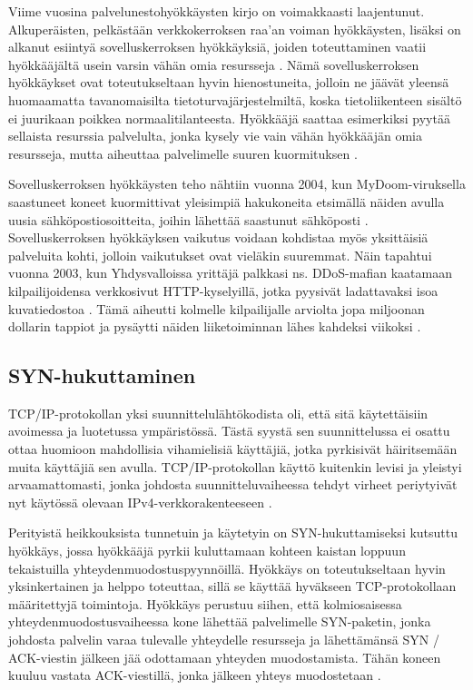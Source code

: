 
Viime vuosina palvelunestohyökkäysten kirjo on voimakkaasti
laajentunut. Alkuperäisten, pelkästään verkkokerroksen raa’an voiman
hyökkäysten, lisäksi on alkanut esiintyä sovelluskerroksen
hyökkäyksiä, joiden toteuttaminen vaatii hyökkääjältä usein varsin
vähän omia resursseja \cite{Hacking}. Nämä sovelluskerroksen
hyökkäykset ovat toteutukseltaan hyvin hienostuneita, jolloin ne
jäävät yleensä huomaamatta tavanomaisilta tietoturvajärjestelmiltä,
koska tietoliikenteen sisältö ei juurikaan poikkea
normaalitilanteesta. Hyökkääjä saattaa esimerkiksi pyytää sellaista
resurssia palvelulta, jonka kysely vie vain vähän hyökkääjän omia
resursseja, mutta aiheuttaa palvelimelle suuren kuormituksen
\cite{DDOSb}.

Sovelluskerroksen hyökkäysten teho nähtiin vuonna 2004, kun
MyDoom-\-viruksella saastuneet koneet kuormittivat yleisimpiä
hakukoneita etsimällä näiden avulla uusia sähköpostiosoitteita, joihin
lähettää saastunut sähköposti \cite{Hacking}. Sovelluskerroksen
hyökkäyksen vaikutus voidaan kohdistaa myös yksittäisiä palveluita
kohti, jolloin vaikutukset ovat vieläkin suuremmat. Näin tapahtui
vuonna 2003, kun Yhdysvalloissa yrittäjä palkkasi ns. DDoS-mafian
kaatamaan kilpailijoidensa verkkosivut HTTP-kyselyillä, jotka pyysivät
ladattavaksi isoa kuvatiedostoa \cite{DDOSb}. Tämä aiheutti kolmelle
kilpailijalle arviolta jopa miljoonan dollarin tappiot ja pysäytti
näiden liiketoiminnan lähes kahdeksi viikoksi \cite{FBI}.


\subsection{SYN-hukuttaminen}
TCP/IP-protokollan yksi suunnittelulähtökodista oli, että sitä
käytettäisiin avoimessa ja luotetussa ympäristössä. Tästä syystä sen
suunnittelussa ei osattu ottaa huomioon mahdollisia vihamielisiä
käyttäjiä, jotka pyrkisivät häiritsemään muita käyttäjiä sen
avulla. TCP/IP-protokollan käyttö kuitenkin levisi ja yleistyi
arvaamattomasti, jonka johdosta suunnitteluvaiheessa tehdyt virheet
periytyivät nyt käytössä olevaan IPv4-verkkorakenteeseen \cite{Hacking}.

Perityistä heikkouksista tunnetuin ja käytetyin on SYN-hukuttamiseksi kutsuttu
hyökkäys, jossa hyökkääjä pyrkii kuluttamaan kohteen kaistan loppuun
tekaistuilla yhteydenmuodostuspyynnöillä. Hyökkäys on toteutukseltaan hyvin
yksinkertainen ja helppo toteuttaa, sillä se käyttää hyväkseen TCP-protokollaan
määritettyjä toimintoja. Hyökkäys perustuu siihen, että kolmiosaisessa
yhteydenmuodostusvaiheessa kone lähettää palvelimelle SYN-paketin, jonka
johdosta palvelin varaa tulevalle yhteydelle resursseja ja lähettämänsä SYN /
ACK-viestin jälkeen jää odottamaan yhteyden muodostamista. Tähän koneen kuuluu
vastata ACK-viestillä, jonka jälkeen yhteys muodostetaan \cite{Hacking}.

